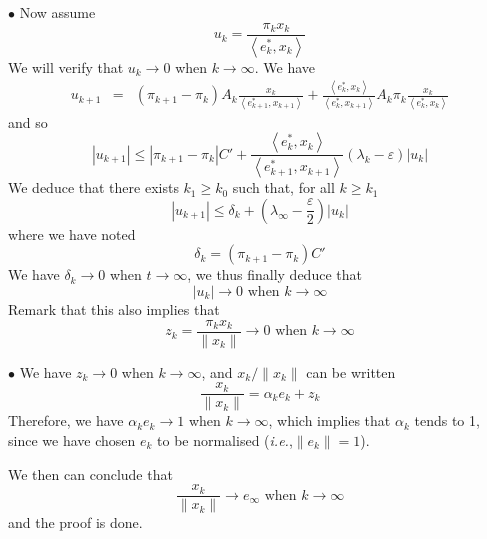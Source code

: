 \documentclass[12pt]{article}
\def\Point{$\bullet$ }
\def\ie{\emph{i.e.},}
\begin{document}
\Point Now assume
\[
u_k=\frac{\pi_k x_k}{\left<e_k^*,x_k\right>}
\]
We will verify that $u_k\to 0$ when $k\to\infty$. We have
\begin{eqnarray*}
u_{k+1}&=& (\pi_{k+1}-\pi_k)A_k\frac{x_k}{\left<e_{k+1}^*,x_{k+1}\right>} +
\frac{\left<e_k^*,x_k\right>}{\left<e_k^*,x_{k+1}\right>} A_k\pi_k\frac{x_k}{\left<e_k^*,x_k\right>}
\end{eqnarray*}
and so
\[
|u_{k+1}|\leq
|\pi_{k+1}-\pi_k|C'+\frac{\left<e_k^*,x_k\right>}{\left<e_{k+1}^*,x_{k+1}\right>}
(\lambda_k-\varepsilon) |u_k|
\]
We deduce that there exists $k_1\geq k_0$ such that, for all $k\geq k_1$
\[
|u_{k+1}| \leq \delta_k+(\lambda_\infty-\frac{\varepsilon}{2}) |u_k|
\]
where we have noted
\[
\delta_k=(\pi_{k+1}-\pi_k)C'
\]
We have $\delta_k\to 0$ when $t\to\infty$, we thus finally deduce that 
\[
|u_k|\to 0\textrm{ when }k\to\infty
\]
Remark that this also implies that
\[
z_k=\frac{\pi_kx_k}{\|x_k\|}\to 0\textrm{ when } k\to\infty
\]

\Point We have $z_k\to 0$ when $k\to\infty$, and $x_k/\|x_k\|$
can be written
\[
\frac{x_k}{\|x_k\|}=\alpha_ke_k+z_k
\]
Therefore, we have $\alpha_ke_k\to 1$ when $k\to\infty$, which implies 
that $\alpha_k$ tends to 1, since we have chosen $e_k$ to be
normalised (\ie $\|e_k\|=1$).

We then can conclude that
\[
\frac{x_k}{\|x_k\|}\to e_\infty \textrm{ when }k\to\infty
\]
and the proof is done.
\end{document}
